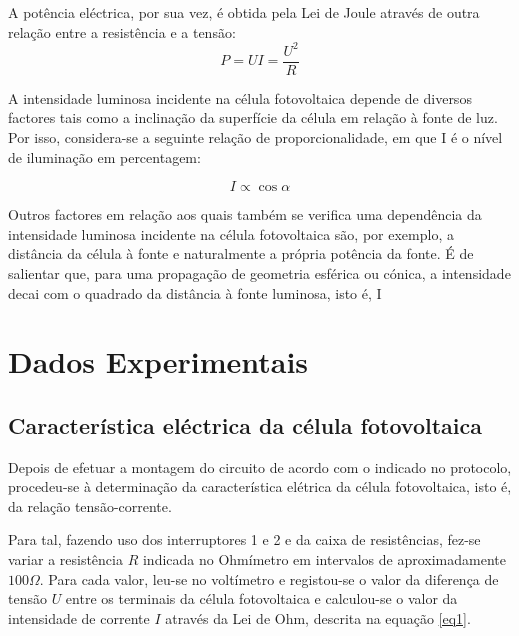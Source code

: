 \documentclass[10pt]{extarticle}
\begin{document}
\begin{multicols}{2}
\par A potência eléctrica, por sua vez, é obtida pela Lei de Joule através de outra relação entre a resistência e a tensão:
\begin{equation} \label{eq2}
P=UI=\frac{U^2}{R}
\end{equation}

\par
A intensidade luminosa incidente na célula fotovoltaica depende de diversos factores tais como a inclinação da superfície da célula em relação à fonte de luz. Por isso, considera-se a seguinte relação de proporcionalidade, em que I é o nível de iluminação em percentagem:

\begin{equation}
I\propto\cos{\alpha}
\end{equation}

\par Outros factores em relação aos quais também se verifica uma dependência da intensidade luminosa incidente na célula fotovoltaica são, por exemplo, a distância da célula à fonte e naturalmente a própria potência da fonte. É de salientar que, para uma propagação de geometria esférica ou cónica, a intensidade decai com o quadrado da distância à fonte luminosa, isto é, I \propto {}


\section{Dados Experimentais}

\subsection*{\normalsize Característica eléctrica da célula fotovoltaica}

\par Depois de efetuar a montagem do circuito de acordo com o indicado no protocolo, procedeu-se à determinação da característica elétrica da célula fotovoltaica, isto é, da relação tensão-corrente.

\par Para tal, fazendo uso dos interruptores 1 e 2 e da caixa de resistências, fez-se variar a resistência $R$ indicada no Ohmímetro em intervalos de aproximadamente $100\Omega$. Para cada valor, leu-se no voltímetro e registou-se o valor da diferença de tensão $U$ entre os terminais da célula fotovoltaica e calculou-se o valor da intensidade de corrente $I$ através da Lei de Ohm, descrita na equação \eqref{eq1}.


\end{multicols}
\end{document}
